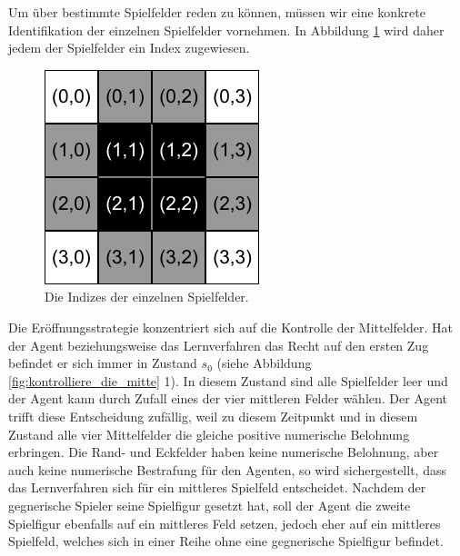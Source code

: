 
Um über bestimmte Spielfelder reden zu können, müssen wir eine konkrete Identifikation der einzelnen Spielfelder vornehmen. In Abbildung \ref{fig:tictactoe_spielfeld_indizes} wird daher jedem der Spielfelder ein Index zugewiesen.

\begin{figure}[!htbp]
  \centering
  \includegraphics[scale = 1]{inhalt/abbildungen/tictactoe_spielfeld_indizes.pdf}
  \caption{Die Indizes der einzelnen Spielfelder.}
  \label{fig:tictactoe_spielfeld_indizes}
\end{figure}

Die Eröffnungsstrategie konzentriert sich auf die Kontrolle der Mittelfelder. Hat der Agent beziehungsweise das Lernverfahren das Recht auf den ersten Zug befindet er sich immer in Zustand $s_0$ (siehe Abbildung \ref{fig:kontrolliere_die_mitte} 1). In diesem Zustand sind alle Spielfelder leer und der Agent kann durch Zufall eines der vier mittleren Felder wählen. Der Agent trifft diese Entscheidung zufällig, weil zu diesem Zeitpunkt und in diesem Zustand alle vier Mittelfelder die gleiche positive numerische Belohnung erbringen. Die Rand- und Eckfelder haben keine numerische Belohnung, aber auch keine numerische Bestrafung für den Agenten, so wird sichergestellt, dass das Lernverfahren sich für ein mittleres Spielfeld entscheidet. Nachdem der gegnerische Spieler seine Spielfigur gesetzt hat, soll der Agent die zweite Spielfigur ebenfalls auf ein mittleres Feld setzen, jedoch eher auf ein mittleres Spielfeld, welches sich in einer Reihe ohne eine gegnerische Spielfigur befindet. 

